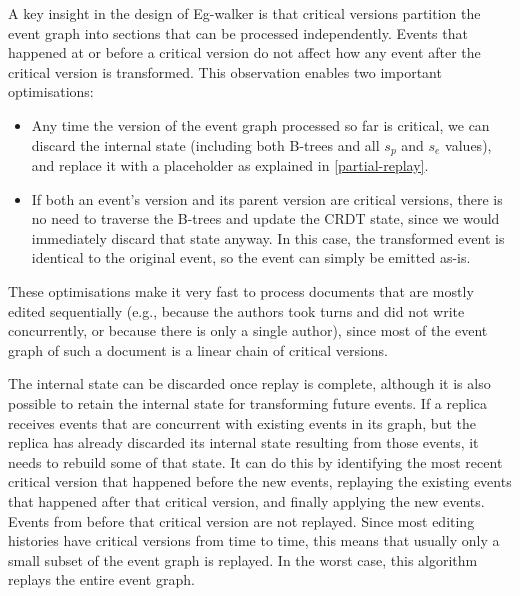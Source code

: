 \documentclass[sigplan,10pt]{acmart}
\newcommand{\algname}{Eg-walker\xspace}
\begin{document}
A key insight in the design of \algname is that critical versions partition the event graph into sections that can be processed independently. Events that happened at or before a critical version do not affect how any event after the critical version is transformed. %
This observation enables two important optimisations:

\begin{itemize}
\item Any time the version of the event graph processed so far is critical, we can discard the internal state (including both B-trees and all $s_p$ and $s_e$ values), and replace it with a placeholder as explained in \autoref{partial-replay}.
\item If both an event's version and its parent version are critical versions, there is no need to traverse the B-trees and update the CRDT state, since we would immediately discard that state anyway. In this case, the transformed event is identical to the original event, so the event can simply be emitted as-is.
\end{itemize}

These optimisations make it very fast to process documents that are mostly edited sequentially (e.g., because the authors took turns and did not write concurrently, or because there is only a single author), since most of the event graph of such a document is a linear chain of critical versions.

The internal state can be discarded once replay is complete, although it is also possible to retain the internal state for transforming future events.
If a replica receives events that are concurrent with existing events in its graph, but the replica has already discarded its internal state resulting from those events, it needs to rebuild some of that state.
It can do this by identifying the most recent critical version that happened before the new events, replaying the existing events that happened after that critical version, and finally applying the new events.
Events from before that critical version are not replayed.
Since most editing histories have critical versions from time to time, this means that usually only a small subset of the event graph is replayed.
In the worst case, this algorithm replays the entire event graph.
\end{document}
